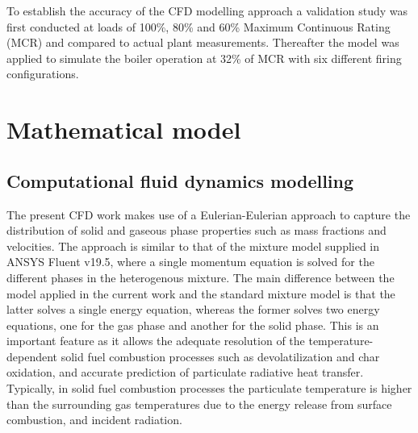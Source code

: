 \documentclass[11pt,cleanfoot]{asme2ej}
\begin{document}
To establish the accuracy of the CFD modelling approach a validation study was first conducted at loads of 100\%, 80\% and 60\% Maximum Continuous Rating (MCR) and compared to actual plant measurements. Thereafter the model was applied to simulate the boiler operation at 32\% of MCR with six different firing configurations.

\section{Mathematical model}
\subsection{Computational fluid dynamics modelling}
The present CFD work makes use of a Eulerian-Eulerian approach to capture the distribution of solid and gaseous phase properties such as mass fractions and velocities. The approach is similar to that of the mixture model supplied in ANSYS Fluent v19.5\textsuperscript{\textregistered}, where a single momentum equation is solved for the different phases in the heterogenous mixture. The main difference between the model applied in the current work and the standard mixture model is that the latter solves a single energy equation, whereas the former solves two energy equations, one for the gas phase and another for the solid phase. This is an important feature as it allows the adequate resolution of the temperature-dependent solid fuel combustion processes such as devolatilization and char oxidation, and accurate prediction of particulate radiative heat transfer. Typically, in solid fuel combustion processes the particulate temperature is higher than the surrounding gas temperatures due to the energy release from surface combustion, and incident radiation.
\end{document}
